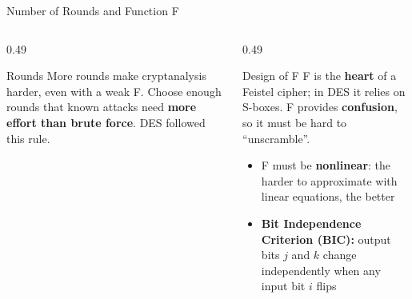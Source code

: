 \documentclass[aspectratio=169,11pt,xcolor={table}]{beamer}
\begin{document}
\begin{frame}{Number of Rounds and Function F}
  \begin{columns}[T]
    \begin{column}{0.49\textwidth}
      \centering
      \begin{block}{Rounds}
        \small More rounds make cryptanalysis harder, even with a weak F. Choose enough rounds that known attacks need \textbf{more effort than brute force}. DES followed this rule.
      \end{block}
    \end{column}
    \begin{column}{0.49\textwidth}
      \begin{alertblock}{Design of F}
        \small F is the \textbf{heart} of a Feistel cipher; in DES it relies on S-boxes. F provides \textbf{confusion}, so it must be hard to ``unscramble''.
      \end{alertblock}
      \begin{itemize}\small\setlength{\itemsep}{3pt}
        \item F must be \textbf{nonlinear}: the harder to approximate with linear equations, the better
        \item \textbf{Bit Independence Criterion (BIC):} output bits $j$ and $k$ change independently when any input bit $i$ flips
      \end{itemize}
    \end{column}
  \end{columns}
\end{frame}
\end{document}
